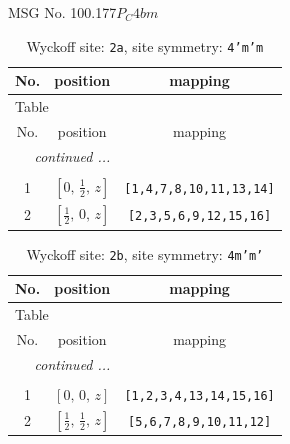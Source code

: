 \documentclass[fleqn,8pt]{jsarticle}
\begin{document}
\setcounter{MaxMatrixCols}{32}

\renewcommand{\tablename}{Table~}
\renewcommand{\figurename}{Figure~}
\begin{center}
\LARGE
MSG No. 100.177\quad$P_{C}4bm$
\end{center}
\renewcommand{\arraystretch}{1.2}
\begin{longtable}{ccc}
\caption{Wyckoff site: {\tt 2a}, site symmetry: {\tt 4'm'm}}
 \\
 \hline \hline
No. & position & mapping \\ \hline \endfirsthead

\multicolumn{2}{l}{\tablename\ \thetable{}} \\
 \hline \hline
No. & position & mapping \\ \hline \endhead

 \hline \hline
\multicolumn{2}{r}{\footnotesize\it continued ...} \\ \endfoot

 \hline \hline
\multicolumn{2}{r}{} \\ \endlastfoot

1 & $\left[ 0,\, \frac{1}{2},\, z \right]$ & {\tt [1,4,7,8,10,11,13,14]} \\ \hline
2 & $\left[ \frac{1}{2},\, 0,\, z \right]$ & {\tt [2,3,5,6,9,12,15,16]} \\
\end{longtable}
\renewcommand{\arraystretch}{1.2}
\begin{longtable}{ccc}
\caption{Wyckoff site: {\tt 2b}, site symmetry: {\tt 4m'm'}}
 \\
 \hline \hline
No. & position & mapping \\ \hline \endfirsthead

\multicolumn{2}{l}{\tablename\ \thetable{}} \\
 \hline \hline
No. & position & mapping \\ \hline \endhead

 \hline \hline
\multicolumn{2}{r}{\footnotesize\it continued ...} \\ \endfoot

 \hline \hline
\multicolumn{2}{r}{} \\ \endlastfoot

1 & $\left[ 0,\, 0,\, z \right]$ & {\tt [1,2,3,4,13,14,15,16]} \\ \hline
2 & $\left[ \frac{1}{2},\, \frac{1}{2},\, z \right]$ & {\tt [5,6,7,8,9,10,11,12]} \\
\end{longtable}
\end{document}
